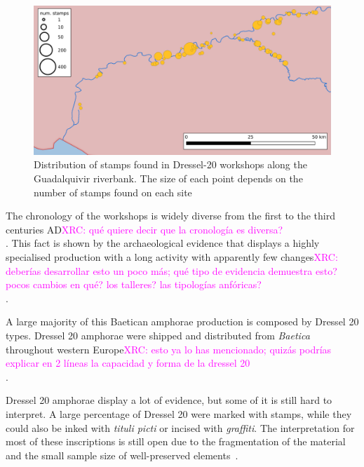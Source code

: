 \documentclass[review]{elsarticle}
\newcommand{\memo}[2]{\textcolor{#1}{#2}}
\newcommand{\xavi}[1]{\memo{magenta}{XRC: #1\\}}
\begin{document}
\begin{figure}[htp]
	\centering
\includegraphics[width=\linewidth]{figs/baetica}
\caption{Distribution of stamps found in Dressel-20 workshops along the Guadalquivir riverbank. The size of each point depends on the number of stamps found on each site}

\label{workshop}
\end{figure} 


The chronology of the workshops is widely diverse from the first to the third centuries AD\xavi{qué quiere decir que la cronología es diversa?} \citep{millet_anforas_1998,rodriguez_baetican_1998,chic2005comercio}. 
This fact is shown by the archaeological evidence that displays a highly specialised production with a long activity with apparently few changes\xavi{deberías desarrollar esto un poco más; qué tipo de evidencia demuestra esto? pocos cambios en qué? los talleres? las tipologías anfóricas?} \citep{remesal_anforas_2004}.


A large majority of this Baetican amphorae production is composed by Dressel 20 types\citep{dressel_ricerche_1878,millet_anforas_1998}. Dressel 20 amphorae were shipped and distributed from \textit{Baetica} throughout western Europe\xavi{esto ya lo has mencionado; quizás podrías explicar en 2 líneas la capacidad y forma de la dressel 20}. 

Dressel 20 amphorae display a lot of evidence, but some of it is still hard to interpret. A large percentage of Dressel 20 were marked with stamps, while they could also be inked with \textit{tituli picti} or incised with \textit{graffiti}. The interpretation for most of these inscriptions is still open due to the fragmentation of the material and the small sample size of well-preserved elements~\citep{aguilera_evolucion_2007,rovira_guardiola_grafitos_2007}. 

 
\end{document}
